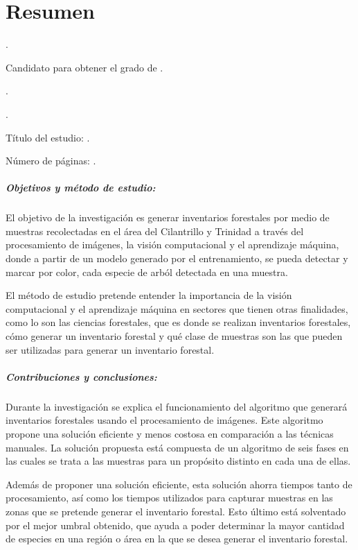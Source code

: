 
\chapter{Resumen}

{\setlength{\leftskip}{10mm}
\setlength{\parindent}{-10mm}

\autor.

Candidato para obtener el grado de \grado\orientacion.

\uanl.

\fime.

Título del estudio: \textsc{\titulo}.

\noindent Número de páginas: \pageref*{lastpage}.}

\paragraph{Objetivos y método de estudio:}
El objetivo de la investigación es generar inventarios forestales por medio de muestras recolectadas en el área del Cilantrillo y Trinidad a través del procesamiento de imágenes, la visión computacional y el aprendizaje máquina, donde a partir de un modelo generado por el entrenamiento, se pueda detectar y marcar por color, cada especie de arból detectada en una muestra.

El método de estudio pretende entender la importancia de la visión computacional y el aprendizaje máquina en sectores que tienen otras finalidades, como lo son las ciencias forestales, que es donde se realizan inventarios forestales, cómo generar un inventario forestal y  qué clase de muestras son las que pueden ser utilizadas para generar un inventario forestal.
\paragraph{Contribuciones y conclusiones:}
Durante la investigación se explica el funcionamiento del algoritmo que generará inventarios forestales usando el procesamiento de imágenes. Este algoritmo propone una solución eficiente y menos costosa en comparación a las técnicas manuales. La solución propuesta está compuesta de un algoritmo de seis fases en las cuales se trata a las muestras para un propósito distinto en cada una de ellas. 

Además de proponer una solución eficiente, esta solución ahorra tiempos tanto de procesamiento, así como los tiempos utilizados para capturar muestras en las zonas que se pretende generar el inventario forestal. Esto último está solventado por el mejor umbral obtenido, que ayuda a poder determinar la mayor cantidad de especies en una región o área en la que se desea generar el inventario forestal.

